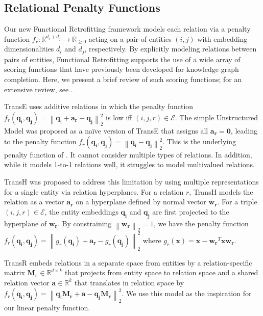 \documentclass[11pt, a4paper]{article}
\newcommand{\norm}[1]{\left\lVert#1\right\rVert}
\begin{document}
\subsection{Relational Penalty Functions}
Our new Functional Retrofitting framework models each relation via a penalty function $f_r: \mathbb{R}^{d_i+d_j}\rightarrow \mathbb{R}_{\ge 0}$ acting on a pair of entities $(i,j)$ with embedding dimensionalities $d_i$ and $d_j$, respectively. By explicitly modeling relations between pairs of entities, Functional Retrofitting supports the use of a wide array of scoring functions that have previously been developed for knowledge graph completion. Here, we present a brief review of such scoring functions; for an extensive review, see \cite{nickel2016review}.

TransE \cite{bordes2013translating} uses additive relations in which the penalty function $f_r(\boldsymbol{q_i}, \boldsymbol{q_j}) = \norm{\boldsymbol{q_i} + \boldsymbol{a_r} - \boldsymbol{q_j}}^2_2$ is low iff $(i, j, r) \in \mathcal{E}$. The simple Unstructured Model \cite{bordes2012joint} was proposed as a na{\"i}ve version of TransE that assigns all $\boldsymbol{a_r} = \boldsymbol{0}$, leading to the penalty function $f_r(\boldsymbol{q_i}, \boldsymbol{q_j}) = \norm{\boldsymbol{q_i}-\boldsymbol{q_j}}_2^2$. This is the underlying penalty function of \cite{Faruqui-etal:2015}. It cannot consider multiple types of relations. In addition, while it models  1-to-1 relations well, it struggles to model multivalued relations.

TransH \cite{wang2014knowledge} was proposed to address this limitation by using multiple representations for a single entity via relation hyperplanes. For a relation $r$, TransH models the relation as a vector $\boldsymbol{a_r}$ on a hyperplane defined by normal vector $\boldsymbol{w_r}$. For a triple $(i, j, r) \in \mathcal{E}$, the entity embeddings $\boldsymbol{q_i}$ and $\boldsymbol{q_j}$ are first projected to the hyperplane of $\boldsymbol{w_r}$. By constraining $\norm{\boldsymbol{w_r}}_2 = 1$, we have the penalty function $f_r(\boldsymbol{q_i}, \boldsymbol{q_j}) = \norm{g_r(\boldsymbol{q_i}) + \boldsymbol{a_r} - g_r(\boldsymbol{q_j})}^2_2$ where $g_r(\boldsymbol{x}) = \boldsymbol{x} - \boldsymbol{w_r}^T\boldsymbol{x}\boldsymbol{w_r}$.

TransR \cite{lin2015learning} embeds relations in a separate space from entities by a relation-specific matrix $\boldsymbol{M_r}\in \mathbb{R}^{d \times k}$ that projects from entity space to relation space and a shared relation vector $\boldsymbol{a}\in \mathbb{R}^{k}$ that translates in relation space by $f_r(\boldsymbol{q_i}, \boldsymbol{q_j}) = \norm{\boldsymbol{q_i}\boldsymbol{M_r} + \boldsymbol{a} - \boldsymbol{q_j}\boldsymbol{M_r}}_2^2$. We use this model as the inspiration for our linear penalty function.
\end{document}

